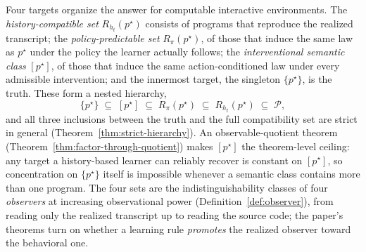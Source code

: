 \documentclass[11pt]{article}
\theoremstyle{definition}
\theoremstyle{remark}
\newcommand{\Pcal}{\mathcal{P}}
\begin{document}
Four targets organize the answer for computable interactive environments. The \emph{history-compatible set} $R_{h_t}(p^\star)$ consists of programs that reproduce the realized transcript; the \emph{policy-predictable set} $R_\pi(p^\star)$, of those that induce the same law as $p^\star$ under the policy the learner actually follows; the \emph{interventional semantic class} $[p^\star]$, of those that induce the same action-conditioned law under every admissible intervention; and the innermost target, the singleton $\{p^\star\}$, is the truth. These form a nested hierarchy,
\[
\{p^\star\}
\;\subseteq\;
[p^\star]
\;\subseteq\;
R_\pi(p^\star)
\;\subseteq\;
R_{h_t}(p^\star)
\;\subseteq\;
\Pcal,
\]
and all three inclusions between the truth and the full compatibility set are strict in general (Theorem~\ref{thm:strict-hierarchy}). An observable-quotient theorem (Theorem~\ref{thm:factor-through-quotient}) makes $[p^\star]$ the theorem-level ceiling: any target a history-based learner can reliably recover is constant on $[p^\star]$, so concentration on $\{p^\star\}$ itself is impossible whenever a semantic class contains more than one program. The four sets are the indistinguishability classes of four \emph{observers} at increasing observational power (Definition~\ref{def:observer}), from reading only the realized transcript up to reading the source code; the paper's theorems turn on whether a learning rule \emph{promotes} the realized observer toward the behavioral one.
\end{document}
